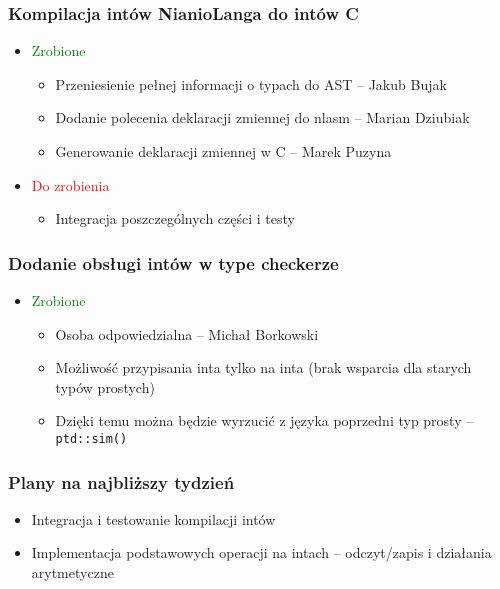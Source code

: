 \documentclass{beamer}
\begin{document}
	\begin{frame}
		\frametitle{Kompilacja intów NianioLanga do intów C}
		\begin{itemize}
			\item\textcolor{green}{Zrobione}
			\begin{itemize}
				\item Przeniesienie pełnej informacji o typach do AST -- Jakub Bujak
				\item Dodanie polecenia deklaracji zmiennej do nlasm -- Marian Dziubiak
				\item Generowanie deklaracji zmiennej w C -- Marek Puzyna
			\end{itemize}
			\item\textcolor{red}{Do zrobienia}
			\begin{itemize}
				\item Integracja poszczególnych części i testy
			\end{itemize}
		\end{itemize}
	\end{frame}
	
	\begin{frame}
		\frametitle{Dodanie obsługi intów w type checkerze}
		\begin{itemize}
			\item\textcolor{green}{Zrobione}
			\begin{itemize}
				\item Osoba odpowiedzialna -- Michał Borkowski
				\item Możliwość przypisania inta tylko na inta (brak wsparcia dla starych typów prostych)
				\item Dzięki temu można będzie wyrzucić z języka poprzedni typ prosty -- \texttt{ptd::sim()}
			\end{itemize}
		\end{itemize}
	\end{frame}
	
	\begin{frame}
		\frametitle{Plany na najbliższy tydzień}
		\begin{itemize}
			\item Integracja i testowanie kompilacji intów
			\item Implementacja podstawowych operacji na intach -- odczyt/zapis i działania arytmetyczne
		\end{itemize}
	\end{frame}
\end{document}

